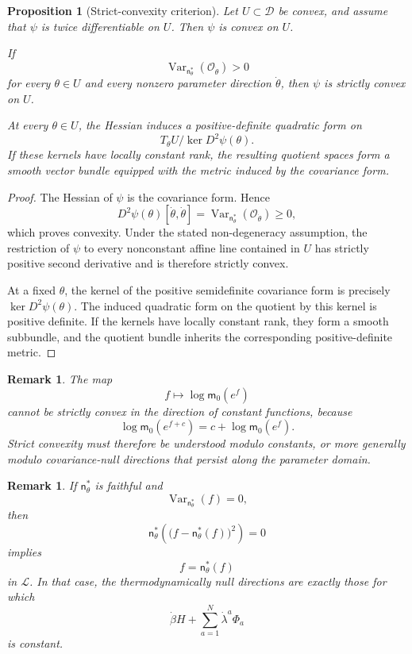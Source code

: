 \documentclass[11pt,reqno]{amsart}
\newtheorem{Proposition}[Theorem]{Proposition}
\newtheorem{rem}[Theorem]{Remark}
\begin{document}
\begin{Proposition}[Strict-convexity criterion]
\label{prop:strict-convexity}
Let $U\subset\mathcal D$ be convex, and assume that $\psi$ is twice
differentiable on $U$. Then $\psi$ is convex on $U$.

If
\[
\operatorname{Var}_{\mathsf n_\theta^*}
(\mathcal O_{\dot\theta})>0
\]
for every $\theta\in U$ and every nonzero parameter direction
$\dot\theta$, then $\psi$ is strictly convex on $U$.

At every $\theta\in U$, the Hessian induces a positive-definite
quadratic form on
\[
T_\theta U\big/\ker D^2\psi(\theta).
\]
If these kernels have locally constant rank, the resulting quotient
spaces form a smooth vector bundle equipped with the metric induced by
the covariance form.
\end{Proposition}

\begin{proof}
The Hessian of $\psi$ is the covariance form. Hence
\[
D^2\psi(\theta)[\dot\theta,\dot\theta]
=
\operatorname{Var}_{\mathsf n_\theta^*}
(\mathcal O_{\dot\theta})
\geq 0,
\]
which proves convexity. Under the stated non-degeneracy assumption, the
restriction of $\psi$ to every nonconstant affine line contained in
$U$ has strictly positive second derivative and is therefore strictly
convex.

At a fixed $\theta$, the kernel of the positive semidefinite covariance
form is precisely $\ker D^2\psi(\theta)$. The induced quadratic form on
the quotient by this kernel is positive definite. If the kernels have
locally constant rank, they form a smooth subbundle, and the quotient
bundle inherits the corresponding positive-definite metric.
\end{proof}

\begin{rem}
The map
\[
f\longmapsto\log\mathsf m_0(e^f)
\]
cannot be strictly convex in the direction of constant functions,
because
\[
\log\mathsf m_0(e^{f+c})
=
c+\log\mathsf m_0(e^f).
\]
Strict convexity must therefore be understood modulo constants, or more
generally modulo covariance-null directions that persist along the
parameter domain.
\end{rem}

\begin{rem}
If $\mathsf n_\theta^*$ is faithful and
\[
\operatorname{Var}_{\mathsf n_\theta^*}(f)=0,
\]
then
\[
\mathsf n_\theta^*
\left(
\bigl(f-\mathsf n_\theta^*(f)\bigr)^2
\right)
=
0
\]
implies
\[
f=\mathsf n_\theta^*(f)
\]
in $\mathcal L$. In that case, the thermodynamically null directions
are exactly those for which
\[
\dot\beta H+\sum_{a=1}^{N}\dot\lambda^a\Phi_a
\]
is constant.
\end{rem}
\end{document}
